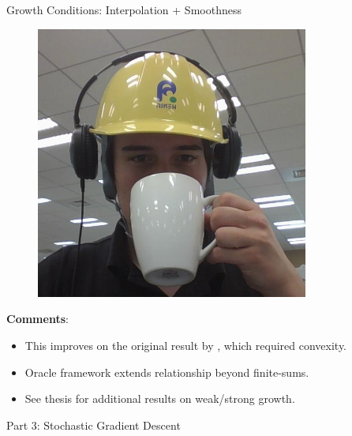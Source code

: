 \documentclass[mathserif,notheorems, hyperref={colorlinks, citecolor=blue, urlcolor=blue, linkcolor=blue}]{beamer}
\def\\{}%
\begin{document}
\begin{frame}{Growth Conditions: Interpolation + Smoothness}
\begin{center}
\begin{minipage}[t]{0.15\textwidth}
\begin{figure}[t]
                \vspace{0.5ex}

                \includegraphics[width=0.8\textwidth]{collaborators/fred}
            \end{figure} 
        \end{minipage}
        
    \end{center}
    \textbf{Comments}:
    \begin{itemize}
        \item This improves on the original result by \citet{vaswani2019fast}, which required convexity.
        \item Oracle framework extends relationship beyond finite-sums. 
        \item See thesis for additional results on weak/strong growth. 
    \end{itemize}

    \end{frame}


    \begin{frame}
       \begin{center}
          \huge Part 3: Stochastic Gradient Descent\\
       \end{center} 
    \end{frame}
    
\end{document}
